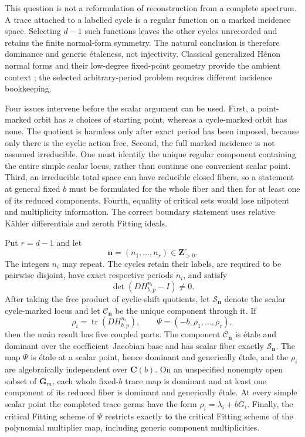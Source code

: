 \documentclass[11pt]{article}
\theoremstyle{definition}
\theoremstyle{remark}
\newcommand{\C}{\mathbf C}
\newcommand{\Gm}{\mathbf G_m}
\newcommand{\Z}{\mathbf Z}
\newcommand{\cC}{\mathcal C}
\newcommand{\cS}{\mathcal S}
\newcommand{\bn}{\mathbf n}
\newcommand{\tr}{\operatorname{tr}}
\begin{document}
This question is not a reformulation of reconstruction from a complete
spectrum.  A trace attached to a labelled cycle is a regular function on a
marked incidence space.  Selecting $d-1$ such functions leaves the other
cycles unrecorded and retains the finite normal-form symmetry.  The natural
conclusion is therefore dominance and generic étaleness, not injectivity.
Classical generalized Hénon normal forms and their low-degree fixed-point
geometry provide the ambient context \cite{FM89}; the selected
arbitrary-period problem requires different incidence bookkeeping.

Four issues intervene before the scalar argument can be used.  First, a
point-marked orbit has $n$ choices of starting point, whereas a cycle-marked
orbit has none.  The quotient is harmless only after exact period has been
imposed, because only there is the cyclic action free.  Second, the full
marked incidence is not assumed irreducible.  One must identify the unique
regular component containing the entire simple scalar locus, rather than
continue one convenient scalar point.  Third, an irreducible total space can
have reducible closed fibers, so a statement at general fixed $b$ must be
formulated for the whole fiber and then for at least one of its reduced
components.  Fourth, equality of critical sets would lose nilpotent and
multiplicity information.  The correct boundary statement uses relative
Kähler differentials and zeroth Fitting ideals.

Put $r=d-1$ and let
\[
  \bn=(n_1,\ldots,n_r)\in\Z_{>0}^r.
\]
The integers $n_i$ may repeat.  The cycles retain their labels, are required
to be pairwise disjoint, have exact respective periods $n_i$, and satisfy
\[
  \det(DH_{b,p}^{n_i}-I)\neq 0.
\]
After taking the free product of cyclic-shift quotients, let
$\cS_{\bn}$ denote the scalar cycle-marked locus and let $\cC_{\bn}$ be the
unique component through it.  If
\[
  \rho_i=\tr(DH_{b,p}^{n_i}),
  \qquad
  \Psi=(-b,\rho_1,\ldots,\rho_r),
\]
then the main result has five coupled parts.  The component $\cC_{\bn}$ is
étale and dominant over the coefficient--Jacobian base and has scalar fiber
exactly $\cS_{\bn}$.  The map $\Psi$ is étale at a scalar point, hence
dominant and generically étale, and the $\rho_i$ are algebraically independent
over $\C(b)$.  On an unspecified nonempty open subset of $\Gm$, each whole
fixed-$b$ trace map is dominant and at least one component of its reduced
fiber is dominant and generically étale.  At every simple scalar point the
completed trace germs have the form $\rho_i=\lambda_i+bG_i$.  Finally, the
critical Fitting scheme of $\Psi$ restricts exactly to the critical Fitting
scheme of the polynomial multiplier map, including generic component
multiplicities.
\end{document}
